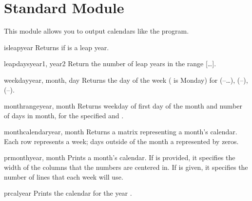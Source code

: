 
\section{Standard Module }



This module allows you to output calendars like the \UNIX{}
 program.

\begin{funcdesc}{isleap}{year}
Returns  if  is a leap year.
\end{funcdesc}

\begin{funcdesc}{leapdays}{year1, year2}
Return the number of leap years in the range
[\ldots{}].
\end{funcdesc}

\begin{funcdesc}{weekday}{year, month, day}
Returns the day of the week ( is Monday) for 
(--\ldots),  (--), 
(--).
\end{funcdesc}

\begin{funcdesc}{monthrange}{year, month}
Returns weekday of first day of the month and number of days in month, 
for the specified  and .
\end{funcdesc}

\begin{funcdesc}{monthcalendar}{year, month}
Returns a matrix representing a month's calendar.  Each row represents
a week; days outside of the month a represented by zeros.
\end{funcdesc}

\begin{funcdesc}{prmonth}{year, month}
Prints a month's calendar.  If  is provided, it specifies
the width of the columns that the numbers are centered in.  If
 is given, it specifies the number of lines that each
week will use.
\end{funcdesc}

\begin{funcdesc}{prcal}{year}
Prints the calendar for the year .
\end{funcdesc}
